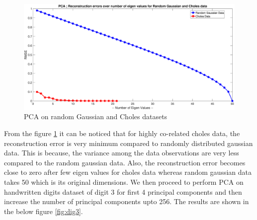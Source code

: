 \begin{figure}
	\captionsetup{format = hang}
	\includegraphics[height = 0.5\textwidth,width = 1\textwidth]{Exercise3/Report/Ex_3_1}
	\caption{PCA on random Gaussian and Choles datasets}\label{fig:Ex_3_1}
\end{figure}
From the figure \ref{fig:Ex_3_1} it can be noticed that for highly co-related choles data, the reconstruction error is very minimum compared to randomly distributed gaussian data. This is because, the variance among the data observations are very less compared to the random gaussian data. Also, the reconstruction error becomes close to zero after few eigen values for choles data whereas random gaussian data takes 50 which is its original dimensions. We then proceed to perform PCA on handwritten digits dataset of digit 3 for first 4 principal components and then increase the number of principal components upto 256. The results are shown in the below figure \ref{fig:dig3}.
